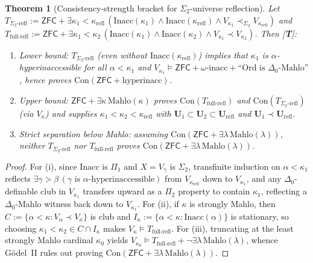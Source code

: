 \documentclass[11pt]{article}
\theoremstyle{plain}
\newtheorem{theorem}{Theorem}[section]
\theoremstyle{definition}
\newcommand{\Con}{\mathrm{Con}}
\newcommand{\ZFC}{\mathsf{ZFC}}
\begin{document}
\begin{theorem}[Consistency-strength bracket for $\Sigma_2$-universe reflection]\label{thm:b2-sigma2-bracket}
Let $T_{\Sigma_2\text{-}\mathrm{refl}} := \ZFC + \exists \kappa_1 < \kappa_{\mathrm{refl}}\,(\mathrm{Inacc}(\kappa_1) \wedge \mathrm{Inacc}(\kappa_{\mathrm{refl}}) \wedge V_{\kappa_1} \prec_{\Sigma_2} V_{\kappa_{\mathrm{refl}}})$ and $T_{\mathrm{full}\text{-}\mathrm{refl}} := \ZFC + \exists \kappa_1 < \kappa_2\,(\mathrm{Inacc}(\kappa_1) \wedge \mathrm{Inacc}(\kappa_2) \wedge V_{\kappa_1} \prec V_{\kappa_2})$. Then \textup{[\textbf{T}]}:
\begin{enumerate}[nosep,label=(\roman*)]
\item \emph{Lower bound}: $T_{\Sigma_2\text{-}\mathrm{refl}}$ (even without $\mathrm{Inacc}(\kappa_{\mathrm{refl}})$) implies that $\kappa_1$ is $\alpha$-hyperinaccessible for all $\alpha < \kappa_1$ and $V_{\kappa_1} \models \ZFC + \omega\text{-}\mathrm{inacc} + \text{``}\mathrm{Ord}\text{ is }\Delta_0\text{-Mahlo''}$, hence proves $\Con(\ZFC + \text{hyperinacc})$.
\item \emph{Upper bound}: $\ZFC + \exists \kappa\,\mathrm{Mahlo}(\kappa)$ proves $\Con(T_{\mathrm{full}\text{-}\mathrm{refl}})$ and $\Con(T_{\Sigma_2\text{-}\mathrm{refl}})$ (via $V_\kappa$) and supplies $\kappa_1 < \kappa_2 < \kappa_{\mathrm{refl}}$ with $\mathbf{U}_1 \subset \mathbf{U}_2 \subset \mathbf{U}_{\mathrm{refl}}$ and $\mathbf{U}_1 \prec \mathbf{U}_{\mathrm{refl}}$.
\item \emph{Strict separation below Mahlo}: assuming $\Con(\ZFC + \exists \lambda\,\mathrm{Mahlo}(\lambda))$, neither $T_{\Sigma_2\text{-}\mathrm{refl}}$ nor $T_{\mathrm{full}\text{-}\mathrm{refl}}$ proves $\Con(\ZFC + \exists \lambda\,\mathrm{Mahlo}(\lambda))$.
\end{enumerate}
\end{theorem}
\begin{proof}
For (i), since $\mathrm{Inacc}$ is $\Pi_1$ and $X = V_\gamma$ is $\Sigma_2$, transfinite induction on $\alpha < \kappa_1$ reflects $\exists \gamma > \beta\,(\gamma\text{ is }\alpha\text{-hyperinaccessible})$ from $V_{\kappa_{\mathrm{refl}}}$ down to $V_{\kappa_1}$, and any $\Delta_0$-definable club in $V_{\kappa_1}$ transfers upward as a $\Pi_2$ property to contain $\kappa_1$, reflecting a $\Delta_0$-Mahlo witness back down to $V_{\kappa_1}$. For (ii), if $\kappa$ is strongly Mahlo, then $C := \{\alpha < \kappa : V_\alpha \prec V_\kappa\}$ is club and $I_\kappa := \{\alpha < \kappa : \mathrm{Inacc}(\alpha)\}$ is stationary, so choosing $\kappa_1 < \kappa_2 \in C \cap I_\kappa$ makes $V_\kappa \models T_{\mathrm{full}\text{-}\mathrm{refl}}$. For (iii), truncating at the least strongly Mahlo cardinal $\kappa_0$ yields $V_{\kappa_0} \models T_{\mathrm{full}\text{-}\mathrm{refl}} + \neg\exists\lambda\,\mathrm{Mahlo}(\lambda)$, whence G\"odel~II rules out proving $\Con(\ZFC + \exists\lambda\,\mathrm{Mahlo}(\lambda))$.
\end{proof}
\end{document}
